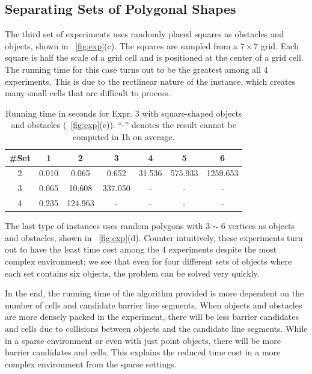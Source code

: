 \subsection{Separating Sets of Polygonal Shapes}
The third set of experiments uses randomly placed squares as obstacles and objects, shown in ~\ref{fig:exp}(c). The squares are sampled from a $7\times7$ grid. Each square is half the scale of a grid cell and is positioned at the center of a grid cell. The running time for this case turns out to be the greatest among all $4$ experiments. This is due to the rectlinear nature of the instance, which creates many small cells that are difficult to process. 

\begin{table}[ht]
    \centering
    \begin{tabular}{|c|c|c|c|c|c|c|}\hline
         \#Set &  1 & 2 & 3 & 4& 5& 6\\\hline
 2 & 0.010 & 0.065 & 0.652 & 31.536 & 575.933 & 1259.653\\\hline
 3 & 0.065 & 10.608 & 337.050 & - & - & -\\\hline
 4 & 0.235 & 124.963 & - & - & - & -\\\hline
    \end{tabular}
    \caption{Running time in seconds for Expr. 3 with square-shaped objects and obstacles (~\ref{fig:exp}(c)). ``-'' denotes the result cannot be computed in 1h on average. 
    }
    \label{tab:expr_3}
    \vspace{-2mm}
\end{table}
 
The last type of instances uses random polygons with $3\sim 6$ vertices
as objects and obstacles, shown in ~\ref{fig:exp}(d). 
Counter intuitively, these experiments turn out to have the least time cost among the $4$ experiments despite the most complex environment; we see that even for four different sets of objects where each set contains six objects, the problem can be solved very quickly. %

In the end, the running time of the algorithm provided is more dependent on the number of cells and candidate barrier line segments. 
When objects and obstacles are more densely packed in the experiment, 
there will be less barrier candidates and cells due to collisions between objects and the candidate line segments.
While in a sparse environment or even with just point objects, there will be more barrier candidates and cells.
This explains the reduced time cost in a more complex environment from the sparse settings.

